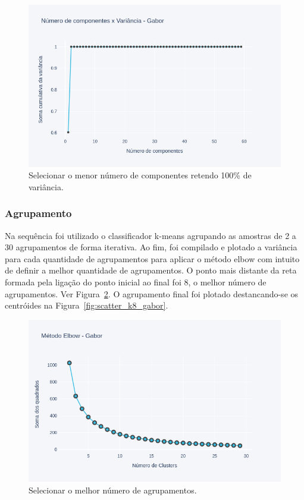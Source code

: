\documentclass[a4paper, 12 pt, conference]{ieeeconf}  %
\begin{document}
\begin{figure}[!htbp]
	\centering
	\includegraphics[width=1.0\linewidth,clip=true,trim=0cm 0cm 0cm 0cm, keepaspectratio=true]{points_pca_gabor.png}
	\caption{Selecionar o menor número de componentes retendo 100\% de variância.}
	\label{fig:points_pca_gabor}
\end{figure}

\subsubsection{Agrupamento}
Na sequência foi utilizado o classificador k-means agrupando as amostras de 2 a 30 agrupamentos de forma iterativa. Ao fim, foi compilado e plotado a variância para cada quantidade de agrupamentos para aplicar o método elbow com intuito de definir a melhor quantidade de agrupamentos. O ponto mais distante da reta formada pela ligação do ponto inicial ao final foi 8, o melhor número de agrupamentos. Ver Figura~\ref{fig:points_elbow_gabor}. O agrupamento final foi plotado destancando-se os centróides na Figura~\ref{fig:scatter_k8_gabor}.

\begin{figure}[!htbp]
	\centering
	\includegraphics[width=1.0\linewidth,clip=true,trim=0cm 0cm 0cm 0cm, keepaspectratio=true]{points_elbow_gabor.png}
	\caption{Selecionar o melhor número de agrupamentos.}
	\label{fig:points_elbow_gabor}
\end{figure}
\end{document}
